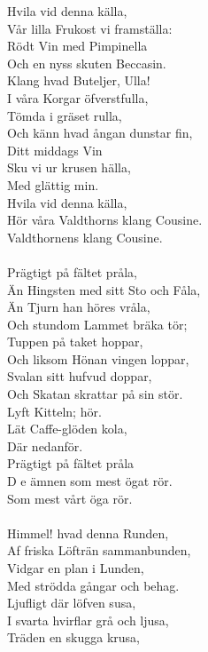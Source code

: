 \vspace{10pt}
Hvila vid denna källa,\\ 
Vår lilla Frukost vi framställa:\\ 
Rödt Vin med Pimpinella\\ 
Och en nyss skuten Beccasin.\\ 
Klang hvad Buteljer, Ulla! \\ 
I våra Korgar öfverstfulla,\\ 
Tömda i gräset rulla,\\ 
Och känn hvad ångan dunstar fin,\\ 
Ditt middags Vin\\ 
Sku vi ur krusen hälla,\\ 
Med glättig min.\\ 
Hvila vid denna källa,\\ 
Hör våra Valdthorns klang Cousine.\\ 
Valdthornens klang Cousine.\\ 
\\ 
Prägtigt på fältet pråla,\\ 
Än Hingsten med sitt Sto och Fåla,\\ 
Än Tjurn han höres vråla,\\ 
Och stundom Lammet bräka tör;\\ 
Tuppen på taket hoppar,\\ 
Och liksom Hönan vingen loppar,\\ 
Svalan sitt hufvud doppar,\\ 
Och Skatan skrattar på sin stör.\\ 
Lyft Kitteln; hör.\\ 
Lät Caffe-glöden kola,\\ 
Där nedanför.\\ 
Prägtigt på fältet pråla\\  
D e ämnen som mest ögat rör.\\ 
Som mest vårt öga rör.\\ 
 \\ 
Himmel! hvad denna Runden,\\ 
Af friska Löfträn sammanbunden,\\ 
Vidgar en plan i Lunden,\\ 
Med strödda gångar och behag.\\ 
Ljufligt där löfven susa,\\ 
I svarta hvirflar grå och ljusa,\\ 
Träden en skugga krusa,\\ 
